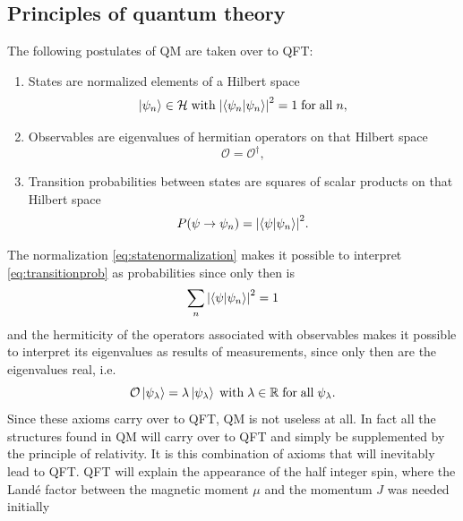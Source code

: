 \subsection{Principles of quantum theory}
\begin{mybox}{}
The following postulates of QM are taken over to QFT:
\begin{enumerate}
	\item States are normalized elements of a Hilbert space
	\begin{equation}
	\label{eq:statenormalization}
		\ket{\psi_n} \in \mathcal{H} \; \mathrm{with} \; \abs{\braket{\psi_n}{\psi_n}}^2 =1 \;\mathrm{for\;all\;} n,
	\end{equation}
	\item Observables are eigenvalues of hermitian operators on that Hilbert space
	\begin{equation}
		\mathcal{O}=\mathcal{O}^\dagger,
	\end{equation}
	\item Transition probabilities between states are squares of scalar products on that Hilbert space
	\begin{equation}
	\label{eq:transitionprob}
		P(\psi \rightarrow\psi_n) = \abs{\braket{\psi}{\psi_n}}^2.
	\end{equation}
	
\end{enumerate}
\end{mybox}
The normalization \ref{eq:statenormalization} makes it possible to interpret \ref{eq:transitionprob} as probabilities since only then is
\begin{equation}
	\sum_n \abs{\braket{\psi}{\psi_n}}^2 =1
\end{equation}
and the hermiticity of the operators associated with observables makes it possible to interpret its eigenvalues as results of measurements, since only then are the eigenvalues real, i.e.
\begin{equation}
	\mathcal{O}\ket{\psi_\lambda} = \lambda \ket{\psi_\lambda} \; \mathrm{with}\; \lambda \in \mathbb{R} \mathrm{\;for\;all\;} \psi_\lambda.
\end{equation}
Since these axioms carry over to QFT, QM is not useless at all. In fact all the structures found in QM will carry over to QFT and simply be supplemented by the principle of relativity. It is this combination of axioms that will inevitably lead to QFT. QFT will explain the appearance of the half integer spin, where the Landé factor between the magnetic moment $\mu$ and the momentum $J$ was needed initially
